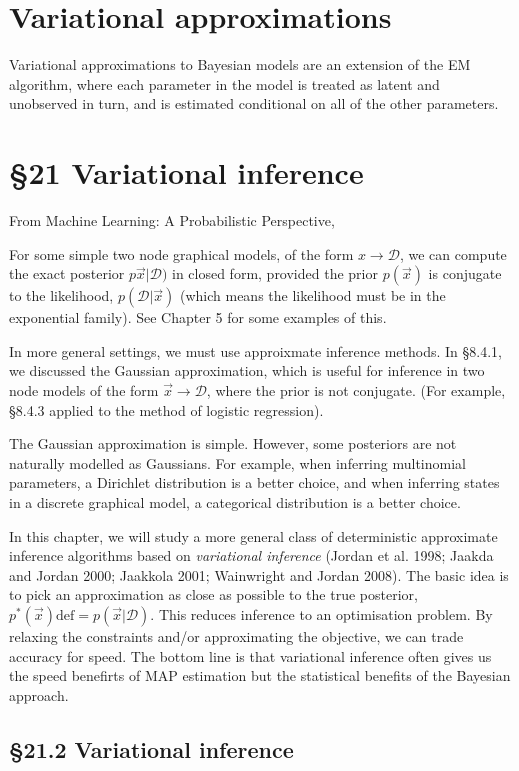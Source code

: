 \documentclass{amsart}
\begin{document}
\section{Variational approximations}
Variational approximations to Bayesian models are an extension of the EM algorithm,
where each parameter in the model is treated as latent and unobserved in turn, and is
estimated conditional on all of the other parameters.

\section{\S 21 Variational inference}

From Machine Learning: A Probabilistic Perspective,

For some simple two node graphical models, of the form $x \to \mathcal{D}$, we can compute
the exact posterior $p\vec{x}|\mathcal{D})$ in closed form, provided the prior $p(\vec{x})$ 
is conjugate to the likelihood, $p(\mathcal{D}|\vec{x})$ (which means the likelihood must
be in the exponential family). See Chapter 5 for some examples of this.

In more general settings, we must use approixmate inference methods. In \S 8.4.1, we
discussed the Gaussian approximation, which is useful for inference in two node models of
the form $\vec{x} \to \mathcal{D}$, where the prior is not conjugate. (For example, 
\S 8.4.3 applied to the method of logistic regression).

The Gaussian approximation is simple. However, some posteriors are not naturally modelled as
Gaussians. For example, when inferring multinomial parameters, a Dirichlet
distribution is a better choice, and when inferring states in a discrete graphical model,
a categorical distribution is a better choice.

In this chapter, we will study a more general class of deterministic approximate inference
algorithms based on \emph{variational inference} (Jordan et al. 1998; Jaakda and Jordan 
2000; Jaakkola 2001; Wainwright and Jordan 2008). The basic idea is to pick an approximation
as close as possible to the true posterior,
$p^{*}(\vec{x}) \text{def} = p(\vec{x}|\mathcal{D})$. This reduces inference to an 
optimisation problem. By relaxing the constraints and/or approximating the objective, we can
trade accuracy for speed. The bottom line is that variational inference often gives us the
speed benefirts of MAP estimation but the statistical benefits of the Bayesian approach.

\subsection{\S 21.2 Variational inference}
\end{document}
